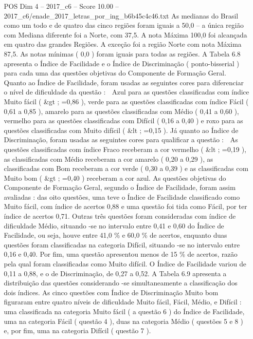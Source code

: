\begin{textsample}{POS Dim 4 – 2017\_c6 – Score 10.00 – 2017\_c6/enade\_2017\_letras\_por\_ing\_b6b45c4c46.txt}
As medianas do Brasil como um todo e de quatro das cinco regiões foram iguais a 50,0 – a única região com Mediana diferente foi a Norte, com 37,5.
A nota Máxima 100,0 foi alcançada em quatro das grandes Regiões.
A exceção foi a região Norte com nota Máxima 87,5.
As notas mínimas ( 0,0 ) foram iguais para todas as regiões.
A Tabela 6.8 apresenta o Índice de Facilidade e o Índice de Discriminação ( ponto-bisserial ) para cada uma das questões objetivas do Componente de Formação Geral.
Quanto ao Índice de Facilidade, foram usadas as seguintes cores para diferenciar o nível de dificuldade da questão :  Azul para as questões classificadas com índice Muito fácil ( \&gt ; =0,86 ), verde para as questões classificadas com índice Fácil ( 0,61 a 0,85 ), amarelo para as questões classificadas com Médio ( 0,41 a 0,60 ), vermelho para as questões classificadas com Difícil ( 0,16 a 0,40 ) e roxo para as questões classificadas com Muito difícil ( \&lt ; =0,15 ).
Já quanto ao Índice de Discriminação, foram usadas as seguintes cores para qualificar a questão :  As questões classificadas com índice Fraco receberam a cor vermelho ( \&lt ; =0,19 ), as classificadas com Médio receberam a cor amarelo ( 0,20 a 0,29 ), as classificadas com Bom receberam a cor verde ( 0,30 a 0,39 ) e as classificadas com Muito bom ( \&gt ; =0,40 ) receberam a cor azul.
As questões objetivas do Componente de Formação Geral, segundo o Índice de Facilidade, foram assim avaliadas : das oito questões, uma teve o Índice de Facilidade classificado como Muito fácil, com índice de acertos 0,88 e uma questão foi tida como Fácil, por ter índice de acertos 0,71.
Outras três questões foram consideradas com índice de dificuldade Médio, situando -se no intervalo entre 0,41 e 0,60 do Índice de Facilidade, ou seja, houve entre 41,0 \% e 60,0 \% de acertos, enquanto duas questões foram classificadas na categoria Difícil, situando -se no intervalo entre 0,16 e 0,40.
Por fim, uma questão apresentou menos de 15 \% de acertos, razão pela qual foram classificadas como Muito difícil.
O Índice de Facilidade variou de 0,11 a 0,88, e o de Discriminação, de 0,27 a 0,52.
A Tabela 6.9 apresenta a distribuição das questões considerando -se simultaneamente a classificação dos dois índices.
As cinco questões com Índice de Discriminação Muito bom figuraram entre quatro níveis de dificuldade Muito fácil, Fácil, Médio, e Difícil : uma classificada na categoria Muito fácil ( a questão 6 ) do Índice de Facilidade, uma na categoria Fácil ( questão 4 ), duas na categoria Médio ( questões 5 e 8 ) e, por fim, uma na categoria Difícil ( questão 7 ).

\end{textsample}
